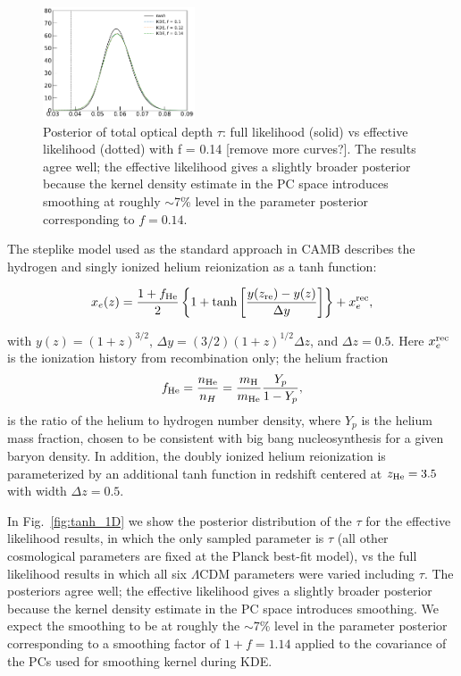 \documentclass[prd,twocolumn,amsmath,amssymb,floatfix,superscriptaddress,nofootinbib]{revtex4-1}
\newcommand{\reffig}[1]{Fig.~\ref{fig:#1}}
\newcommand{\beq}{\begin{equation}}
\newcommand{\eeq}{\end{equation}}
\begin{document}
\begin{figure}
\includegraphics[width=0.40\textwidth]{plots/pl18_pc_zmax30_pliklite_srollv2_1015_tau_posterior_fraccov_1p0_burnin_10000_yes_norm_gaussian0p1_0p12_0p14.pdf}
\caption{Posterior of total optical depth $\tau$: full likelihood (solid) vs effective likelihood (dotted) with f = 0.14 [remove more curves?]. The results agree well; the effective likelihood gives a slightly broader posterior because the kernel density estimate in the PC space introduces smoothing at roughly $\sim$7\% level in the parameter posterior corresponding to $f = 0.14$.
}
\label{fig:tanh_}
\end{figure}

The steplike model used as the standard approach in CAMB describes the hydrogen and singly ionized helium reionization as a tanh function:

 \begin{equation}
x_e(z) = \frac{1+f_{\rm He}}{2}\left\{  1+ \tanh\left[ \frac{y(z_{\rm re})-y(z)}{\Delta y} \right] \right\} + x_e^{\rm rec},
 \label{eqn:tanh_1D}
 \end{equation}
 
 with $y(z)=(1+z)^{3/2}$, $\Delta y=(3/2)(1+z)^{1/2}\Delta z$, and $\Delta z = 0.5$. Here $x_e^{\rm rec}$ is the ionization history from recombination only; the helium fraction
 \beq
 f_{\rm He} = \frac{n_{\rm He}}{n_{H}} = \frac{m_{\rm H}}{m_{\rm He}} \frac{Y_p}{1 - Y_p}, 
 \eeq
 is the ratio of the helium to hydrogen number density, where $Y_p$ is the helium mass fraction, chosen to be consistent with big bang nucleosynthesis for a given baryon density. In addition, the doubly ionized helium reionization is parameterized by an additional tanh function in redshift centered at $z_{\rm He} = 3.5$ with width $\Delta z = 0.5$.

In \reffig{tanh_1D} we show the posterior distribution of the $\tau$ for the effective likelihood results, in which the only sampled parameter is $\tau$ (all other cosmological parameters are fixed at the Planck best-fit model), vs the full likelihood results in which all six $\Lambda$CDM parameters were varied including $\tau$. The posteriors agree well; the effective likelihood gives a slightly broader posterior because the kernel density estimate in the PC space introduces smoothing. We expect the smoothing to be at roughly the $\sim$7\% level in the parameter posterior corresponding to a smoothing factor of $1+f = 1.14$ applied to the covariance of the PCs used for smoothing kernel during KDE.
\end{document}
